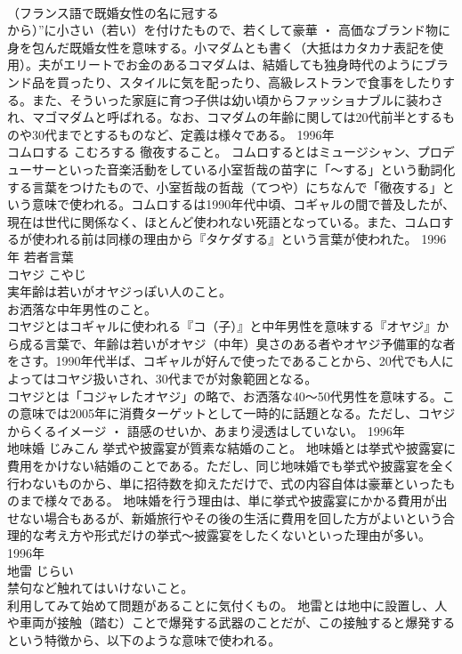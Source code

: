 \documentclass[8pt]{extreport}
\begin{document}
\begin{CJK}{UTF8}{min}
\\	（フランス語で既婚女性の名に冠する
\\	から）”に小さい（若い）を付けたもので、若くして豪華 ・ 高価なブランド物に身を包んだ既婚女性を意味する。小マダムとも書く（大抵はカタカナ表記を使用）。夫がエリートでお金のあるコマダムは、結婚しても独身時代のようにブランド品を買ったり、スタイルに気を配ったり、高級レストランで食事をしたりする。また、そういった家庭に育つ子供は幼い頃からファッショナブルに装わされ、マゴマダムと呼ばれる。なお、コマダムの年齢に関しては20代前半とするものや30代までとするものなど、定義は様々である。	1996年	
\\	コムロする	こむろする	徹夜すること。	コムロするとはミュージシャン、プロデューサーといった音楽活動をしている小室哲哉の苗字に「～する」という動詞化する言葉をつけたもので、小室哲哉の哲哉（てつや）にちなんで「徹夜する」という意味で使われる。コムロするは1990年代中頃、コギャルの間で普及したが、現在は世代に関係なく、ほとんど使われない死語となっている。また、コムロするが使われる前は同様の理由から『タケダする』という言葉が使われた。	1996年	若者言葉	
\\	コヤジ	こやじ	
\\	実年齢は若いがオヤジっぽい人のこと。 
\\	お洒落な中年男性のこと。	
\\	コヤジとはコギャルに使われる『コ（子）』と中年男性を意味する『オヤジ』から成る言葉で、年齢は若いがオヤジ（中年）臭さのある者やオヤジ予備軍的な者をさす。1990年代半ば、コギャルが好んで使ったであることから、20代でも人によってはコヤジ扱いされ、30代までが対象範囲となる。 
\\	コヤジとは「コジャレたオヤジ」の略で、お洒落な40～50代男性を意味する。この意味では2005年に消費ターゲットとして一時的に話題となる。ただし、コヤジからくるイメージ ・ 語感のせいか、あまり浸透はしていない。	1996年	
\\	地味婚	じみこん	挙式や披露宴が質素な結婚のこと。	地味婚とは挙式や披露宴に費用をかけない結婚のことである。ただし、同じ地味婚でも挙式や披露宴を全く行わないものから、単に招待数を抑えただけで、式の内容自体は豪華といったものまで様々である。 地味婚を行う理由は、単に挙式や披露宴にかかる費用が出せない場合もあるが、新婚旅行やその後の生活に費用を回した方がよいという合理的な考え方や形式だけの挙式～披露宴をしたくないといった理由が多い。	1996年	
\\	地雷	じらい	
\\	禁句など触れてはいけないこと。 
\\	利用してみて始めて問題があることに気付くもの。	地雷とは地中に設置し、人や車両が接触（踏む）ことで爆発する武器のことだが、この接触すると爆発するという特徴から、以下のような意味で使われる。 

\end{CJK}
\end{document}
